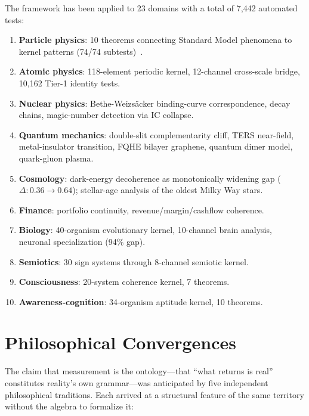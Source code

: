 \documentclass[
  aps,
  prd,
  twocolumn,
  superscriptaddress,
  nofootinbib,
  floatfix
]{revtex4-2}
\newcommand{\IC}{\mathrm{IC}}
\begin{document}
The framework has been applied to 23 domains with a total of
7{,}442 automated tests:

\begin{enumerate}[leftmargin=*,label=(\roman*)]
\item \textbf{Particle physics}: 10 theorems connecting Standard
  Model phenomena to kernel patterns (74/74
  subtests)~\cite{paulus2026sm}.
\item \textbf{Atomic physics}: 118-element periodic kernel,
  12-channel cross-scale bridge, 10{,}162 Tier-1 identity tests.
\item \textbf{Nuclear physics}: Bethe-Weizs\"acker binding-curve
  correspondence, decay chains, magic-number detection via
  $\IC$ collapse.
\item \textbf{Quantum mechanics}: double-slit complementarity cliff,
  TERS near-field, metal-insulator transition, FQHE bilayer graphene,
  quantum dimer model, quark-gluon plasma.
\item \textbf{Cosmology}: dark-energy decoherence as monotonically
  widening gap ($\Delta: 0.36 \to 0.64$); stellar-age analysis
  of the oldest Milky Way stars.
\item \textbf{Finance}: portfolio continuity, revenue/margin/cashflow
  coherence.
\item \textbf{Biology}: 40-organism evolutionary kernel,
  10-channel brain analysis, neuronal specialization (94\% gap).
\item \textbf{Semiotics}: 30 sign systems through 8-channel
  semiotic kernel.
\item \textbf{Consciousness}: 20-system coherence kernel,
  7 theorems.
\item \textbf{Awareness-cognition}: 34-organism aptitude kernel,
  10 theorems.
\end{enumerate}

\section{Philosophical Convergences}\label{sec:philosophy}

The claim that measurement is the ontology---that ``what returns is
real'' constitutes reality's own grammar---was anticipated by five
independent philosophical traditions.  Each arrived at a structural
feature of the same territory without the algebra to formalize it:
\end{document}
